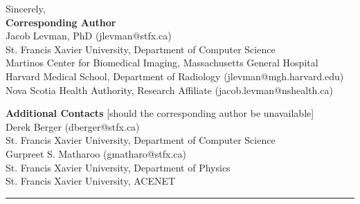 \documentclass[10pt,letter]{article}
\begin{document}
\bigskip

\noindent
Sincerely, \\

\small
\noindent
\textbf{Corresponding Author}\\
Jacob Levman, PhD (jlevman@stfx.ca) \\
\footnotesize
\hspace*{0.25cm}St. Francis Xavier University, Department of Computer Science  \\
\hspace*{0.25cm}Martinos Center for Biomedical Imaging, Massachusetts General Hospital \\
\hspace*{0.25cm}Harvard Medical School, Department of Radiology (jlevman@mgh.harvard.edu) \\
\hspace*{0.25cm}Nova Scotia Health Authority, Research Affiliate (jacob.levman@nshealth.ca) \\
\normalsize

\small
\noindent
\textbf{Additional Contacts} [should the corresponding author be unavailable]\\
Derek Berger (dberger@stfx.ca)\\
\footnotesize
\hspace*{0.25cm} St. Francis Xavier University, Department of Computer Science \\
\small
Gurpreet S. Matharoo (gmatharo@stfx.ca) \\
\footnotesize
\hspace*{0.25cm} St. Francis Xavier University, Department of Physics \\
\hspace*{0.25cm} St. Francis Xavier University, ACENET
\normalsize






% 

\footnotesize
\begin{center}
\noindent\rule{6cm}{0.4pt}
\end{center}

\AtNextBibliography{\footnotesize}
\printbibliography[heading=none]
\end{document}
